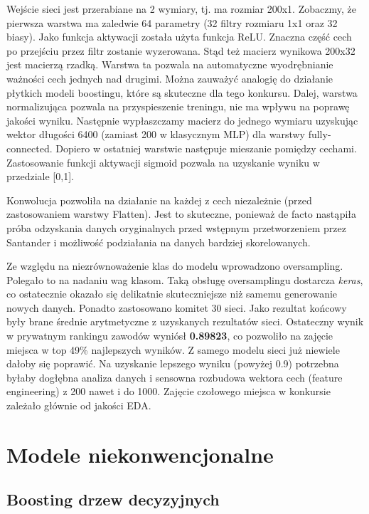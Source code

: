 \documentclass[12pt]{article}
\begin{document}
Wejście sieci jest przerabiane na 2 wymiary, tj. ma rozmiar 200x1. 
Zobaczmy, że pierwsza warstwa ma zaledwie 64 parametry (32 filtry rozmiaru 1x1 oraz 32 biasy). Jako funkcja aktywacji została użyta funkcja ReLU. Znaczna część cech po przejściu przez filtr zostanie wyzerowana. Stąd też macierz wynikowa 200x32 jest macierzą rzadką. Warstwa ta pozwala na automatyczne wyodrębnianie ważności cech jednych nad drugimi. Można zauważyć analogię do działanie płytkich modeli boostingu, które są skuteczne dla tego konkursu. Dalej, warstwa normalizująca pozwala na przyspieszenie treningu, nie ma wpływu na poprawę jakości wyniku. Następnie wypłaszczamy macierz do jednego wymiaru uzyskując wektor długości 6400 (zamiast 200 w klasycznym MLP) dla warstwy fully-connected. Dopiero w ostatniej warstwie następuje mieszanie pomiędzy cechami. Zastosowanie funkcji aktywacji sigmoid pozwala na uzyskanie wyniku w przedziale [0,1].

Konwolucja pozwoliła na działanie na każdej z cech niezależnie (przed zastosowaniem warstwy Flatten). Jest to skuteczne, ponieważ de facto nastąpiła próba odzyskania danych oryginalnych przed wstępnym przetworzeniem przez Santander i możliwość podziałania na danych bardziej skorelowanych. 

Ze względu na niezrównoważenie klas do modelu wprowadzono oversampling. Polegało to na nadaniu wag klasom. Taką obsługę oversamplingu dostarcza \textit{keras}, co ostatecznie okazało się delikatnie skuteczniejsze niż samemu generowanie nowych danych. Ponadto zastosowano komitet 30 sieci. Jako rezultat końcowy były brane średnie arytmetyczne z uzyskanych rezultatów sieci. Ostateczny wynik w prywatnym rankingu zawodów wyniósł \textbf{0.89823}, co pozwoliło na zajęcie miejsca w top 49\% najlepszych wyników. Z samego modelu sieci już niewiele dałoby się poprawić. Na uzyskanie lepszego wyniku (powyżej 0.9) potrzebna byłaby dogłębna analiza danych i sensowna rozbudowa wektora cech (feature engineering) z 200 nawet i do 1000. Zajęcie czołowego miejsca w konkursie zależało głównie od jakości EDA.

\section{Modele niekonwencjonalne}

\subsection{Boosting drzew decyzyjnych}
\end{document}

